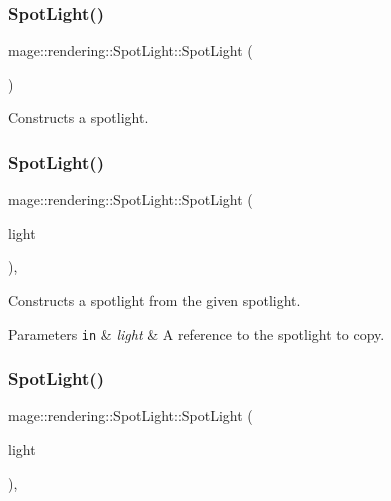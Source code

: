 \subsubsection{\texorpdfstring{Spot\+Light()}{SpotLight()}\hspace{0.1cm}{\footnotesize\ttfamily [1/3]}}
{\footnotesize\ttfamily mage\+::rendering\+::\+Spot\+Light\+::\+Spot\+Light (\begin{DoxyParamCaption}{ }\end{DoxyParamCaption})\hspace{0.3cm}{\ttfamily [noexcept]}}

Constructs a spotlight. \hypertarget{classmage_1_1rendering_1_1_spot_light_a3e94a01b574efb8af5540e24d7af75c6}{}\label{classmage_1_1rendering_1_1_spot_light_a3e94a01b574efb8af5540e24d7af75c6} 
\subsubsection{\texorpdfstring{Spot\+Light()}{SpotLight()}\hspace{0.1cm}{\footnotesize\ttfamily [2/3]}}
{\footnotesize\ttfamily mage\+::rendering\+::\+Spot\+Light\+::\+Spot\+Light (\begin{DoxyParamCaption}\item[{const \hyperlink{classmage_1_1rendering_1_1_spot_light}{Spot\+Light} \&}]{light }\end{DoxyParamCaption})\hspace{0.3cm}{\ttfamily [default]}, {\ttfamily [noexcept]}}

Constructs a spotlight from the given spotlight.


\begin{DoxyParams}[1]{Parameters}
\mbox{\tt in}  & {\em light} & A reference to the spotlight to copy. \\
\hline
\end{DoxyParams}
\hypertarget{classmage_1_1rendering_1_1_spot_light_a3520d2b04ca636436211e8e4fd929b42}{}\label{classmage_1_1rendering_1_1_spot_light_a3520d2b04ca636436211e8e4fd929b42} 
\subsubsection{\texorpdfstring{Spot\+Light()}{SpotLight()}\hspace{0.1cm}{\footnotesize\ttfamily [3/3]}}
{\footnotesize\ttfamily mage\+::rendering\+::\+Spot\+Light\+::\+Spot\+Light (\begin{DoxyParamCaption}\item[{\hyperlink{classmage_1_1rendering_1_1_spot_light}{Spot\+Light} \&\&}]{light }\end{DoxyParamCaption})\hspace{0.3cm}{\ttfamily [default]}, {\ttfamily [noexcept]}}

